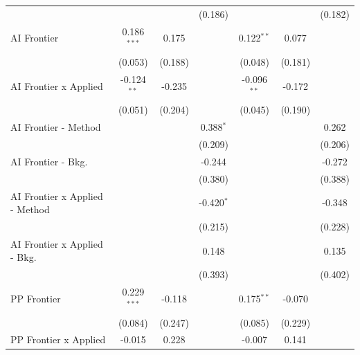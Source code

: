 \begin{tabular}{lcccccc}
                                  &                &                & (0.186)        &                &                & (0.182)\\   
   AI Frontier                    & 0.186$^{***}$  & 0.175          &                & 0.122$^{**}$   & 0.077          &   \\   
                                  & (0.053)        & (0.188)        &                & (0.048)        & (0.181)        &   \\   
   AI Frontier x Applied          & -0.124$^{**}$  & -0.235         &                & -0.096$^{**}$  & -0.172         &   \\   
                                  & (0.051)        & (0.204)        &                & (0.045)        & (0.190)        &   \\   
   AI Frontier - Method           &                &                & 0.388$^{*}$    &                &                & 0.262\\   
                                  &                &                & (0.209)        &                &                & (0.206)\\   
   AI Frontier - Bkg.             &                &                & -0.244         &                &                & -0.272\\   
                                  &                &                & (0.380)        &                &                & (0.388)\\   
   AI Frontier x Applied - Method &                &                & -0.420$^{*}$   &                &                & -0.348\\   
                                  &                &                & (0.215)        &                &                & (0.228)\\   
   AI Frontier x Applied - Bkg.   &                &                & 0.148          &                &                & 0.135\\   
                                  &                &                & (0.393)        &                &                & (0.402)\\   
   PP Frontier                    & 0.229$^{***}$  & -0.118         &                & 0.175$^{**}$   & -0.070         &   \\   
                                  & (0.084)        & (0.247)        &                & (0.085)        & (0.229)        &   \\   
   PP Frontier x Applied          & -0.015         & 0.228          &                & -0.007         & 0.141          &   \\   

\end{tabular}
